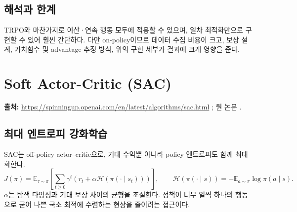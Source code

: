 \documentclass[11pt,a4paper]{article}
\newcommand{\E}{\mathbb{E}}
\begin{document}
\subsection{해석과 한계}
TRPO와 마찬가지로 이산·연속 행동 모두에 적용할 수 있으며, 일차 최적화만으로 구현할 수 있어 훨씬 간단하다. 다만 on-policy이므로 데이터 수집 비용이 크고, 보상 설계, 가치함수 및 advantage 추정 방식, 위의 구현 세부가 결과에 크게 영향을 준다.

\section{Soft Actor-Critic (SAC)}\label{sec:sac}
\noindent\textbf{출처:} \url{https://spinningup.openai.com/en/latest/algorithms/sac.html} \cite{spin-sac}; 원 논문 \cite{sac,sac-apps}.

\subsection{최대 엔트로피 강화학습}
SAC는 off-policy actor--critic으로, 기대 수익뿐 아니라 policy 엔트로피도 함께 최대화한다.
\begin{equation}
 J(\pi)=\E_{\tau\sim\pi}\left[\sum_{t\ge0}\gamma^t\left(r_t+\alpha\mathcal H(\pi(\cdot\mid s_t))\right)\right],
 \qquad\mathcal H(\pi(\cdot\mid s))=-\E_{a\sim\pi}\log\pi(a\mid s).
\end{equation}
\(\alpha\)는 탐색 다양성과 기대 보상 사이의 균형을 조절한다. 정책이 너무 일찍 하나의 행동으로 굳어 나쁜 국소 최적에 수렴하는 현상을 줄이려는 접근이다.
\end{document}

